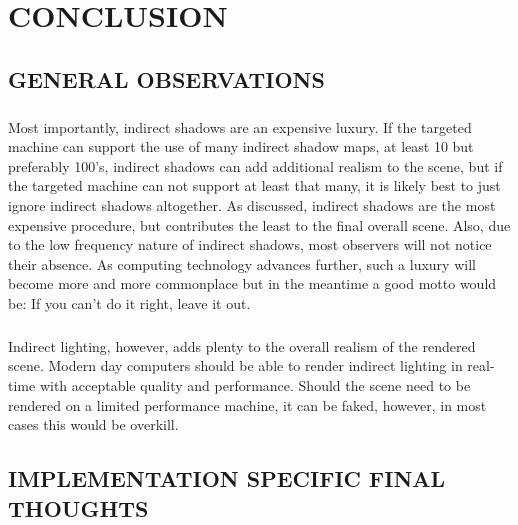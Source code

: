 \chapter{CONCLUSION}

\section{GENERAL OBSERVATIONS}
\paragraph{}
Most importantly, indirect shadows are an expensive luxury.  If the targeted machine can support the use of many indirect shadow maps, at least 10 but preferably 100's, indirect shadows can add additional realism to the scene, but if the targeted machine can not support at least that many, it is likely best to just ignore indirect shadows altogether.  As discussed, indirect shadows are the most expensive procedure, but contributes the least to the final overall scene.  Also, due to the low frequency nature of indirect shadows, most observers will not notice their absence.  As computing technology advances further, such a luxury will become more and more commonplace but in the meantime a good motto would be: If you can't do it right, leave it out.

\paragraph{}
Indirect lighting, however, adds plenty to the overall realism of the rendered scene.  Modern day computers should be able to render indirect lighting in real-time with acceptable quality and performance.  Should the scene need to be rendered on a limited performance machine, it can be faked, however, in most cases this would be overkill.

\section{IMPLEMENTATION SPECIFIC FINAL THOUGHTS}
